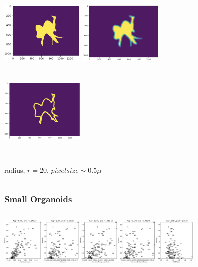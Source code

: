\documentclass{beamer} %
\begin{document}
\begin{frame}
	\begin{figure}
		\centering
		\includegraphics[width=4cm, height=4cm]{Image4}
		\includegraphics[width=4cm, height=4cm]{Image5}
		\includegraphics[width=4cm, height=4cm]{Image6}
		\begin{columns}
			radius, $r= 20$. \newline $pixel size \sim 0.5 \mu$ 
		\end{columns}
	\end{figure}
\end{frame}

\begin{frame}
	\begin{figure}
		\frametitle{Small Organoids}
		\centering
		\includegraphics[width=10cm, height=3cm]{Image2}
	\end{figure}
\end{frame}
\end{document}
